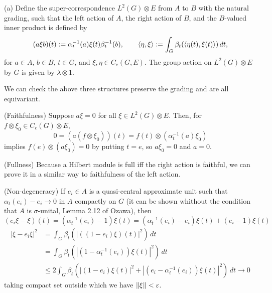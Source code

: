 \documentclass{../../large}
\begin{document}
\begin{pf}
(a)
Define the super-correspondence $L^2(G)\otimes E$ from $A$ to $B$ with the natural grading, such that the left action of $A$, the right action of $B$, and the $B$-valued inner product is defined by
\[(a\xi b)(t):=\alpha_t^{-1}(a)\xi(t)\beta_t^{-1}(b),\qquad\langle\eta,\xi\rangle:=\int_G\beta_t(\langle\eta(t),\xi(t)\rangle)\,dt,\]
for $a\in A$, $b\in B$, $t\in G$, and $\xi,\eta\in C_c(G,E)$.
The group action on $L^2(G)\otimes E$ by $G$ is given by $\lambda\otimes1$.

We can check the above three structures preserve the grading and are all equivariant.

(Faithfulness)
Suppose $a\xi=0$ for all $\xi\in L^2(G)\otimes E$.
Then, for $f\otimes\xi_0\in C_c(G)\otimes E$,
\[0=(a(f\otimes\xi_0))(t)=f(t)\otimes(\alpha_t^{-1}(a)\xi_0)\]
implies $f(e)\otimes(a\xi_0)=0$ by putting $t=e$, so $a\xi_0=0$ and $a=0$.

(Fullness)
Because a Hilbert module is full iff the right action is faithful, we can prove it in a similar way to faithfulness of the left action.

(Non-degeneracy)
If $e_i\in A$ is a quasi-central approximate unit such that $\alpha_t(e_i)-e_i\to0$ in $A$ compactly on $G$ (it can be shown whithout the condition that $A$ is $\sigma$-unital, Lemma 2.12 of Ozawa), then
\[(e_i\xi-\xi)(t)=(\alpha_t^{-1}(e_i)-1)\xi(t)=(\alpha_t^{-1}(e_i)-e_i)\xi(t)+(e_i-1)\xi(t)\]
\begin{align*}
|\xi-e_i\xi|^2
&=\int_G\beta_t(|((1-e_i)\xi)(t)|^2)\,dt\\
&=\int_G\beta_t(|(1-\alpha_t^{-1}(e_i))\xi(t)|^2)\,dt\\
&\le2\int_G\beta_t(|(1-e_i)\xi(t)|^2+|(e_i-\alpha_t^{-1}(e_i))\xi(t)|^2)\,dt\to0
\end{align*}
taking compact set outside which we have $\|\xi\|<\varepsilon$.

\end{pf}
\end{document}
